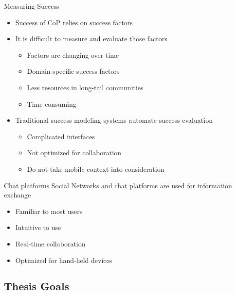 \begin{frame}{Measuring Success}
  \begin{itemize}
    \item Success of CoP relies on success factors
    \item It is difficult to measure and evaluate those factors
          \begin{itemize}
            \item Factors are changing over time \cite{Renz16}
            \item Domain-specific success factors
            \item Less resources in long-tail communities
            \item Time consuming
          \end{itemize}
    \item Traditional success modeling systems automate success evaluation
          \begin{itemize}
            \item Complicated interfaces
            \item Not optimized for collaboration
            \item Do not take mobile context into consideration \cite{Renz16}
          \end{itemize}
  \end{itemize}
\end{frame}

\begin{frame}{Chat platforms}
  Social Networks and chat platforms are used for information exchange
  \begin{itemize}
    \item Familiar to most users
    \item Intuitive to use
    \item Real-time collaboration
    \item Optimized for hand-held devices
  \end{itemize}
\end{frame}


\subsection{Thesis Goals}

